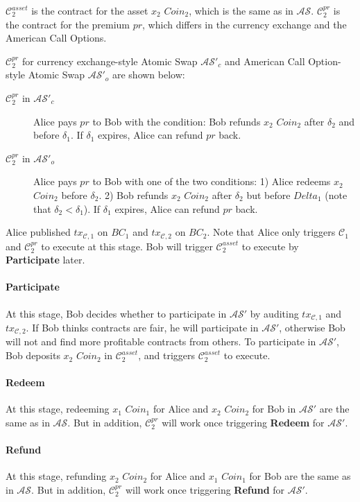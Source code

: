 $\mathcal{C}^{asset}_2$ is the contract for the asset $x_2$ $Coin_2$, which is the same as in $\mathcal{AS}$.
$\mathcal{C}^{pr}_2$ is the contract for the premium $pr$, which differs in the currency exchange and the American Call Options.

$\mathcal{C}^{pr}_2$ for currency exchange-style Atomic Swap $\mathcal{AS}'_{c}$ and American Call Option-style Atomic Swap $\mathcal{AS}'_{o}$ are shown below:

\begin{description}
    \item[$\mathcal{C}^{pr}_2$ in $\mathcal{AS}'_{c}$] Alice pays $pr$ to Bob with the condition:
    Bob refunds $x_2$ $Coin_2$ after $\delta_2$ and before $\delta_1$.
    If $\delta_1$ expires, Alice can refund $pr$ back.
    \item[$\mathcal{C}^{pr}_2$ in $\mathcal{AS}'_{o}$] Alice pays $pr$ to Bob with one of the two conditions:
    1) Alice redeems $x_2$ $Coin_2$ before $\delta_2$.
    2) Bob refunds $x_2$ $Coin_2$ after $\delta_2$ but before $Delta_1$ (note that $\delta_2 < \delta_1$).
    If $\delta_1$ expires, Alice can refund $pr$ back.
\end{description}

Alice published $tx_{\mathcal{C}, 1}$ on $BC_1$ and $tx_{\mathcal{C}, 2}$ on $BC_2$.
Note that Alice only triggers $\mathcal{C}_1$ and $\mathcal{C}^{pr}_2$ to execute at this stage.
Bob will trigger $\mathcal{C}^{asset}_2$ to execute by \textbf{Participate} later.

\paragraph{\textbf{Participate}}
At this stage, Bob decides whether to participate in $\mathcal{AS}'$ by auditing $tx_{\mathcal{C}, 1}$ and $tx_{\mathcal{C}, 2}$.
If Bob thinks contracts are fair, he will participate in $\mathcal{AS}'$, otherwise Bob will not and find more profitable contracts from others.
To participate in $\mathcal{AS}'$, Bob deposits $x_2$ $Coin_2$ in $\mathcal{C}^{asset}_2$, and triggers $\mathcal{C}^{asset}_2$ to execute.

\paragraph{\textbf{Redeem}}
At this stage, redeeming $x_1$ $Coin_1$ for Alice and $x_2$ $Coin_2$ for Bob in $\mathcal{AS}'$ are the same as in $\mathcal{AS}$.
But in addition, $\mathcal{C}^{pr}_2$ will work once triggering \textbf{Redeem} for $\mathcal{AS}'$.

\paragraph{\textbf{Refund}}
At this stage, refunding $x_2$ $Coin_2$ for Alice and $x_1$ $Coin_1$ for Bob are the same as in $\mathcal{AS}$.
But in addition, $\mathcal{C}^{pr}_2$ will work once triggering \textbf{Refund} for $\mathcal{AS}'$.